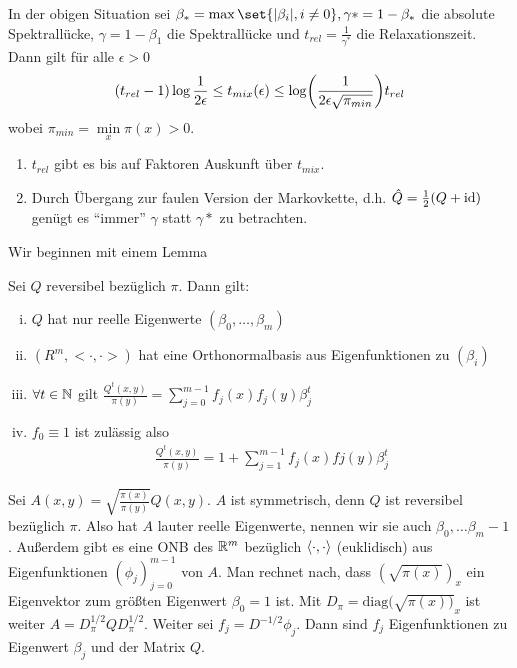 \begin{satz}
	In der obigen Situation sei $\beta_* = \max\set{\abs{\beta_i},i\neq 0}, \gamma* = 1- \beta_*$ die absolute Spektrallücke, $\gamma = 1 - \beta_1$ die Spektrallücke und $t_{rel} = \frac{1}{\gamma^*}$ die Relaxationszeit. Dann gilt für alle $\epsilon > 0$ 
	\begin{align}
		(t_{rel} - 1) \log \frac{1}{2 \epsilon} \leq t_{mix} (\epsilon) \leq \log\enb{\frac{1}{2\epsilon \sqrt{\pi_{min}}}} t_{rel}
	\end{align}
	wobei $\pi_{min} = \min\limits_{x} \pi(x) > 0$.
\end{satz}
\begin{beweis}
	\begin{enumerate}
		\item $t_{rel}$ gibt es bis auf Faktoren Auskunft über $t_{mix}$.
		\item Durch Übergang zur faulen Version der Markovkette, d.h. $\hat{Q} = \frac{1}{2}(Q + \operatorname{id})$ genügt es \enquote{immer} $\gamma$ statt $\gamma*$ zu betrachten.
	\end{enumerate}
	Wir beginnen mit einem Lemma
	\begin{lemma}
		Sei $Q$ reversibel bezüglich $\pi$. Dann gilt:
		\begin{enumerate}[(i)]
			\item $Q$ hat nur reelle Eigenwerte $(\beta_0,\dots,\beta_m)$
			\item $(R^m,<\cdot,\cdot>)$ hat eine Orthonormalbasis aus Eigenfunktionen zu $(\beta_i)$
			\item $\forall t \in \mathbb{N}$ gilt $\frac{Q^t(x,y)}{\pi(y)}  = \sum\limits_{j = 0}^{m-1} f_j(x) f_j(y)\beta_j^t$
			\item $f_0 \equiv 1$ ist zulässig also \begin{align}
				\frac{Q^t(x,y)}{\pi(y)} = 1+ \sum\limits_{j = 1}^{m-1} f_j(x) fj(y) \beta^t_j
					\end{align}
		\end{enumerate}
	\end{lemma}
	\begin{beweis}
		Sei $A(x,y) = \sqrt{\frac{\pi(x)}{\pi(y)}} Q(x,y).$ $A$ ist symmetrisch, denn $Q$ ist reversibel bezüglich $\pi$. Also hat $A$ lauter reelle Eigenwerte, nennen wir sie auch $\beta_0, \dots \beta_m-1$. Außerdem gibt es eine ONB des $\mathbb{R}^m$ bezüglich $\langle\cdot,\cdot\rangle$ (euklidisch) aus Eigenfunktionen $(\phi_j)_{j=0}^{m-1}$ von $A$. Man rechnet nach, dass $(\sqrt{\pi(x)})_x$ ein Eigenvektor zum größten Eigenwert $\beta_0 = 1$ ist. Mit $D_\pi = \text{diag}(\sqrt{\pi(x))}_x$ ist weiter $A = D^{1/2}_{\pi}  Q D^{1/2}_{\pi}$. Weiter sei $f_j =  D^{-1/2} \phi_j$. Dann sind $f_j$ Eigenfunktionen zu Eigenwert $\beta_j$ und der Matrix $Q$. 

\end{beweis}
\end{beweis}
